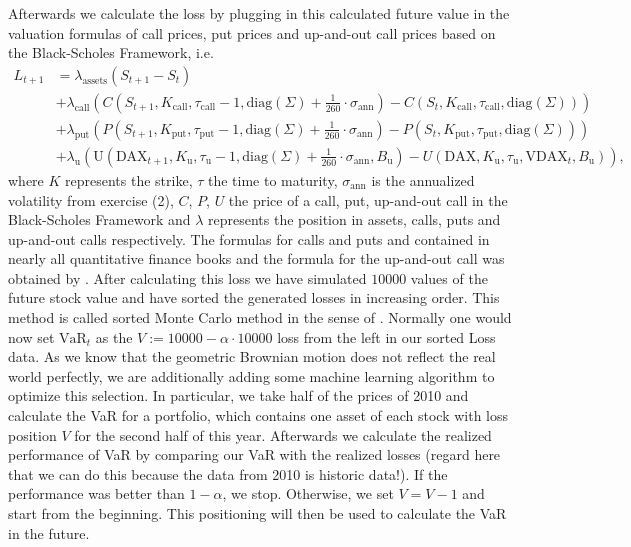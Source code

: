 \documentclass[10pt,a4paper]{article}
\theoremstyle{definition}
\begin{document}
Afterwards we calculate the loss by plugging in this calculated future value in the valuation formulas of call prices, put prices and up-and-out call prices based on the Black-Scholes Framework, i.e.
	\begin{align*}
			L_{t+1}&=\lambda_{\mathrm{assets}} (S_{t+1}-S_t)\\
			&+\lambda_{\mathrm{call}} 
				\left(C\left(S_{t+1},K_{\mathrm{call}},\tau_{\mathrm{call}}-1,\mathrm{diag}(\Sigma)+\frac{1}{260}\cdot\sigma_\mathrm{ann}\right)
				-C(S_{t},K_{\mathrm{call}},\tau_{\mathrm{call}},\mathrm{diag}(\Sigma))\right)\\
			&+\lambda_{\mathrm{put}} 
				\left(P\left(S_{t+1},K_{\mathrm{put}},\tau_{\mathrm{put}}-1,\mathrm{diag}(\Sigma)+\frac{1}{260}\cdot\sigma_\mathrm{ann}\right)
				-P(S_{t},K_{\mathrm{put}},\tau_{\mathrm{put}},\mathrm{diag}(\Sigma))\right)\\
				&+\lambda_{\mathrm{u}} 
				\left(\mathrm{U}\left(\mathrm{DAX}_{t+1},K_{\mathrm{u}},\tau_{\mathrm{u}}-1,\mathrm{diag}(\Sigma)+\frac{1}{260}\cdot\sigma_\mathrm{ann}
				,B_{\mathrm{u}}\right)
				-U(\mathrm{DAX},K_{\mathrm{u}},\tau_{\mathrm{u}},\mathrm{VDAX}_t
				,B_{\mathrm{u}})\right),
	\end{align*}
	where $K$ represents the strike, $\tau$ the time to maturity, 	
	$\sigma_\mathrm{ann}$	is the annualized volatility from exercise (2), $C$, $P$, $U$ the price of a call, put, up-and-out call in the Black-Scholes Framework and $\lambda$ represents the position in assets, calls, puts and up-and-out calls respectively. The formulas for calls and puts and contained in nearly all quantitative finance books and the formula for the up-and-out call was obtained by \cite{CLS94}. After calculating this loss we have simulated
	$10000$ values of the future stock value and have sorted the generated losses in increasing order. This method is called sorted Monte Carlo method in the sense of \cite{JK16}. Normally one would now set
	$\mathrm{VaR}_t$ as the $V:=10000-\alpha\cdot 10000$ loss from the left in our sorted Loss data. As we know that the geometric Brownian motion does not reflect the real world perfectly, we are additionally adding some machine learning algorithm to optimize this selection. In particular, we take half of the prices of 2010 and calculate the VaR for a portfolio, which contains one asset of each stock with loss position $V$ for the second half of this year. Afterwards we calculate the realized performance of VaR by comparing our VaR with the realized losses (regard here that we can do this because the data from 2010 is historic data!). If the performance was better than $1-\alpha$, we stop. Otherwise, we set $V=V-1$ and start from the beginning. This positioning will then be used to calculate the VaR in the future.
		
	



\end{document}

